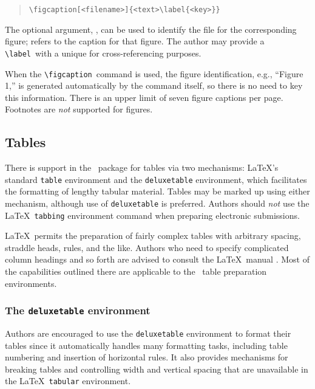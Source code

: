 \documentclass[preprint2]{aastex}
\begin{document}
\begin{quote} 
\begin{verbatim} 
\figcaption[<filename>]{<text>\label{<key>}} 
\end{verbatim} 
\end{quote} 
 
The optional argument, , can be used to iden\-ti\-fy 
the file for the corresponding figure; 
 refers to the caption for that figure.  The author 
may provide a \verb"\label"\ with a unique  for cross-referencing 
purposes. 
 
When the \verb"\figcaption"\  command is used, the figure 
identification, 
e.g., ``Figure 1,'' is generated automatically by the command itself, so 
there is no need to key this information. 
 There is an upper limit of seven figure captions per page. 
Footnotes are \emph{not} supported for figures. 

\subsection{Tables}  \label{tables} 
 
There is support in the \aastex\ package for tables via two mechanisms: 
\LaTeX's standard \texttt{table} environment 
and the 
\texttt{deluxetable} environment, which facilitates the formatting 
of lengthy tabular material.  Tables may be 
marked up using either mechanism, although use of 
\texttt{deluxetable} is preferred. 
Authors should \emph{not} use the \LaTeX\ 
\texttt{tabbing} environment command when preparing electronic 
submissions. 
 
\LaTeX\ permits the preparation of fairly complex tables with 
arbitrary spacing, straddle heads, rules, and the like. 
Authors who need to specify complicated column headings and 
so forth are advised to consult the \LaTeX\ manual \citep{Lamport}. 
Most of the capabilities outlined there are applicable to  the \aastex\ 
 table preparation environments. 
 
\subsubsection{The {\tt deluxetable} environment}  \label{dte} 
 
Authors are encouraged to use the 
\texttt{deluxetable} environment to format their tables since it automatically 
handles many formatting tasks, including table numbering and insertion 
of horizontal rules. It also provides mechanisms for breaking tables and 
controlling width and vertical spacing that are unavailable in the \LaTeX\ 
\texttt{tabular} environment. 
 
\end{document}
